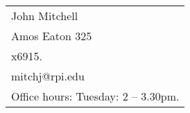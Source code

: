 \documentclass[12pt]{article}
\begin{document}
\vfill

\begin{tabular}{@{\hspace{.5in}}l}
   John Mitchell  \\
   Amos Eaton 325  \\
   x6915.  \\
   mitchj@rpi.edu  \\
   Office hours: Tuesday: 2 -- 3.30pm.
\end{tabular}
\end{document}
